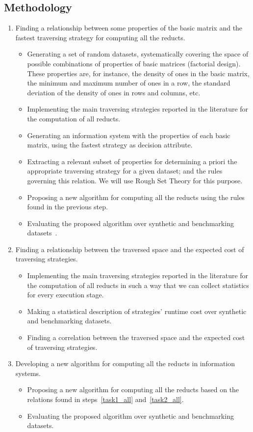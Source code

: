 \documentclass[authoryear,11pt]{elsarticle}
\begin{document}
\subsection{Methodology}\label{Methodology} 
\begin{enumerate}
	\item Finding a relationship between some properties of the basic matrix and the fastest 
  		  traversing strategy for computing all the reducts.\label{task1_all}
	\begin{itemize}
  		\item Generating a set of random datasets, systematically covering the space of possible combinations
  			  of properties of basic matrices (factorial design). These properties are, for instance, the 
  			  density of ones in the basic matrix, the minimum and maximum number of ones in a row, the 
  			  standard deviation of the density of ones in rows and columns, etc.
  		\item Implementing the main traversing strategies reported in the literature for the computation of all
  			  reducts.
  		\item Generating an information system with the properties of each basic matrix, using 
  			  the fastest strategy as decision attribute.
  		\item Extracting a relevant subset of properties for determining a priori the appropriate 
  			  traversing strategy for a given dataset; and the rules governing this relation. We will use
  			  Rough Set Theory for this purpose.
  		\item Proposing a new algorithm for computing all the reducts using the rules found in
  			  the previous step.
  		\item Evaluating the proposed algorithm over synthetic and benchmarking datasets~\citep{Bache13}.
  	\end{itemize}
  	\item Finding a relationship between the traversed space and the expected cost of traversing strategies.
  	\label{task2_all}
  	\begin{itemize}
  		\item Implementing the main traversing strategies reported in the literature for the computation of all
  			  reducts in such a way that we can collect statistics for every execution stage.
  		\item Making a statistical description  of strategies' runtime cost over synthetic and benchmarking
  			  datasets.
  		\item Finding a correlation between the traversed space and the expected cost of traversing strategies.
  	\end{itemize}
  	\item Developing a new algorithm for computing all the reducts in information systems.
  	\begin{itemize}
  		\item Proposing a new algorithm for computing all the reducts based on the relations found in 
  			  steps~\ref{task1_all} and~\ref{task2_all}.
  		\item Evaluating the proposed algorithm over synthetic and benchmarking datasets.
  	\end{itemize}
  	

\end{enumerate}
\end{document}
